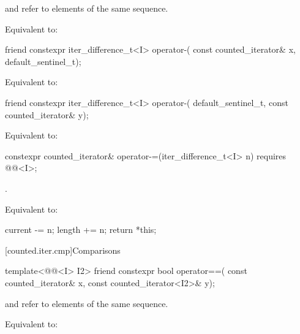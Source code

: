 \begin{itemdescr}
\pnum
\expects
{} and  refer to elements of the same
sequence.

\pnum
\effects
Equivalent to: 
\end{itemdescr}

%
\begin{itemdecl}
friend constexpr iter_difference_t<I> operator-(
  const counted_iterator& x, default_sentinel_t);
\end{itemdecl}

\begin{itemdescr}
\pnum
\effects
Equivalent to:
\end{itemdescr}

%
\begin{itemdecl}
friend constexpr iter_difference_t<I> operator-(
  default_sentinel_t, const counted_iterator& y);
\end{itemdecl}

\begin{itemdescr}
\pnum
\effects
Equivalent to: 
\end{itemdescr}

%
\begin{itemdecl}
constexpr counted_iterator& operator-=(iter_difference_t<I> n)
  requires @@<I>;
\end{itemdecl}

\begin{itemdescr}
\pnum
\expects
{}.

\pnum
\effects
Equivalent to:
\begin{codeblock}
current -= n;
length += n;
return *this;
\end{codeblock}
\end{itemdescr}

[counted.iter.cmp]{Comparisons}

%
\begin{itemdecl}
template<@@<I> I2>
  friend constexpr bool operator==(
    const counted_iterator& x, const counted_iterator<I2>& y);
\end{itemdecl}

\begin{itemdescr}
\pnum
\expects
{} and  refer to
elements of the same sequence.

\pnum
\effects
Equivalent to: 
\end{itemdescr}

